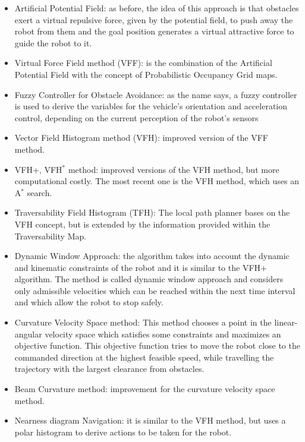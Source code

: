 \begin{itemize}
  \item Artificial Potential Field: as before, the idea of this approach is that
  obstacles exert a virtual repulsive force, given by the potential field, to push
  away the robot from them and the goal position generates a virtual attractive
  force to guide the robot to it.

  \item Virtual Force Field method (VFF): is the combination of the Artificial Potential
  Field with the concept of Probabilistic Occupancy Grid maps.

  \item Fuzzy Controller for Obstacle Avoidance: as the name says, a fuzzy controller
  is used to derive the variables for the vehicle’s orientation and acceleration control,
  depending on the current perception of the robot’s sensors

  \item Vector Field Histogram method (VFH): improved version of the VFF method.

  \item VFH+, VFH$^*$ method: improved versions of the VFH method, but more computational costly.
  The most recent one is the VFH method, which uses an A$^*$ search.

  \item Traversability Field Histogram (TFH): The local path planner bases on
  the VFH concept, but is extended by the information provided within the Traversability Map.

  \item Dynamic Window Approach: the algorithm takes into account the dynamic and kinematic constraints
  of the robot and it is similar to the VFH+ algorithm. The method is called
  dynamic window approach and considers only admissible velocities which can be
  reached within the next time interval and which allow the robot to stop safely.

  \item Curvature Velocity Space method: This method chooses a point in the linear-angular
  velocity space which satisfies some constraints and maximizes an objective function.
  This objective function tries to move the robot close to the commanded direction at
  the highest feasible speed, while travelling the trajectory with the largest clearance from obstacles.

  \item Beam Curvature method: improvement for the curvature velocity space method.

  \item Nearness diagram Navigation: it is similar to the VFH method, but uses
  a polar histogram to derive actions to be taken for the robot.
\end{itemize}

